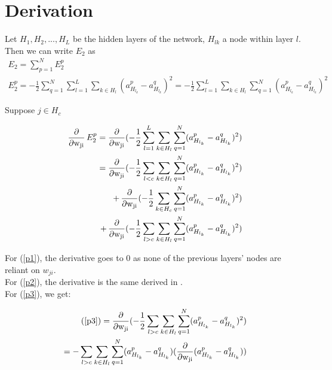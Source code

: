 \section{Derivation}
\label{sec:derivation}

Let $H_1, H_2,...,H_L$ be the hidden layers of the network, $H_{lk}$ a node within layer $l$. Then we can write $E_2$ as 
\begin{gather}
    E_2 = \sum_{p=1}^N E_2^p \\
    E_2^p = -\frac{1}{2}\sum_{q=1}^N\sum_{l=1}^L\sum_{k\in H_{l}} (a_{H_{l_k}}^p - a_{H_{l_k}}^q)^2 = -\frac{1}{2}\sum_{l=1}^L\sum_{k\in H_{l}}\sum_{q=1}^N (a_{H_{l_k}}^p - a_{H_{l_k}}^q)^2
\end{gather}

Suppose $j\in H_c$

\begin{align}
    \Deriv E_2^p = \Deriv (-\frac{1}{2}\sum_{l=1}^L\sum_{k\in H_{l}}\sum_{q=1}^N (a_{H_{l_k}}^p - a_{H_{l_k}}^q)^2) \\
    = \Deriv (-\frac{1}{2}\sum_{l<c}\sum_{k\in H_{l}}\sum_{q=1}^N (a_{H_{l_k}}^p - a_{H_{l_k}}^q)^2) \label{p1}\\
    + \Deriv (-\frac{1}{2}\sum_{k\in H_{c}}\sum_{q=1}^N (a_{H_{l_k}}^p - a_{H_{l_k}}^q)^2) \label{p2}  \\
    + \Deriv (-\frac{1}{2}\sum_{l>c}\sum_{k\in H_{l}}\sum_{q=1}^N (a_{H_{l_k}}^p - a_{H_{l_k}}^q)^2) \label{p3}
\end{align}

For (\ref{p1}), the derivative goes to 0 as none of the previous layers' nodes are reliant on $w_{ji}$. \\
For (\ref{p2}), the derivative is the same derived in \cite{thuan11}. \\
For (\ref{p3}), we get:

\begin{align}
    (\ref{p3}) = \Deriv (-\frac{1}{2}\sum_{l>c}\sum_{k\in H_{l}}\sum_{q=1}^N (a_{H_{l_k}}^p - a_{H_{l_k}}^q)^2) \\
    = -\sum_{l>c}\sum_{k\in H_{l}}\sum_{q=1}^N (a_{H_{l_k}}^p - a_{H_{l_k}}^q) (\Deriv(a_{H_{l_k}}^p - a_{H_{l_k}}^q)) \label{deriv_gen}\\
\end{align}


